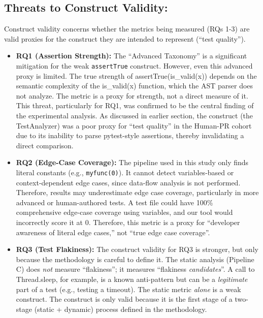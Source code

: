 \documentclass[conference]{IEEEtran}
\begin{document}
\subsection{Threats to Construct Validity:}
Construct validity concerns whether the metrics being measured (RQs 1-3) are valid proxies for the construct they are intended to represent (``test quality'').
\begin{itemize}
    \item \textbf{RQ1 (Assertion Strength):} The ``Advanced Taxonomy'' is a significant mitigation for the weak \texttt{assertTrue} construct. However, even this advanced proxy is limited. The true strength of assertTrue(is\_valid(x)) depends on the semantic complexity of the is\_valid(x) function, which the AST parser does not analyze. The metric is a proxy for strength, not a direct measure of it. This threat, particularly for RQ1, was confirmed to be the central finding of the experimental analysis. As discussed in earlier section, the construct (the TestAnalyzer) was a poor proxy for ``test quality'' in the Human-PR cohort due to its inability to parse pytest-style assertions, thereby invalidating a direct comparison.
    \item \textbf{RQ2 (Edge-Case Coverage):} The pipeline used in this study only finds literal constants (e.g., \texttt{myfunc(0)}). It cannot detect variables-based or context-dependent edge cases, since data-flow analysis is not performed. Therefore, results may underestimate edge case coverage, particularly in more advanced or human-authored tests. A test file could have 100\% comprehensive edge-case coverage using variables, and our tool would incorrectly score it at 0. Therefore, this metric is a proxy for ``developer awareness of literal edge cases,'' not ``true edge case coverage''.
    \item \textbf{RQ3 (Test Flakiness):} The construct validity for RQ3 is stronger, but only because the methodology is careful to define it. The static analysis (Pipeline C) does \textit{not} measure ``flakiness''; it measures ``flakiness \textit{candidates}''. A call to Thread.sleep, for example, is a known anti-pattern but can be a \textit{legitimate} part of a test (e.g., testing a timeout). The static metric \textit{alone} is a weak construct. The construct is only valid because it is the first stage of a two-stage (static + dynamic) process defined in the methodology.
\end{itemize}
\end{document}
